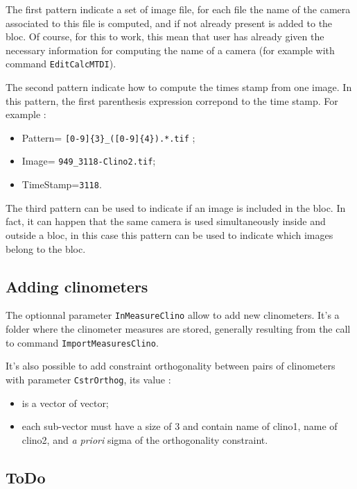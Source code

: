 The first pattern indicate a set of image file, for each file the
name of the camera associated to this file is computed, and if not already
present is added to the bloc. Of course, for this to work, this mean 
that user has already given the necessary information for computing the
name of a camera (for example with command {\tt EditCalcMTDI}).

The second pattern indicate how to compute the times stamp from one image.
In this pattern, the first parenthesis expression correpond to the time stamp.
For example :

\begin{itemize}
	\item  Pattern= {\tt [0-9]\{3\}\_([0-9]\{4\}).*.tif} ;
	\item  Image= {\tt 949\_3118-Clino2.tif};
        \item  TimeStamp={\tt 3118}.
\end{itemize}


The third pattern can be used to indicate if an image is included in the bloc.
In fact, it can happen that the same camera  is  used simultaneously
inside and outside a bloc, in this case this pattern can be used to indicate
which images belong to the bloc.

\subsection{Adding clinometers}

The optionnal parameter {\tt InMeasureClino} allow to add 
new clinometers. It's a folder where  the clinometer
measures are stored, generally resulting from the call to command {\tt ImportMeasuresClino}.

It's also possible to add constraint orthogonality between  pairs of clinometers
with parameter {\tt CstrOrthog}, its value :

\begin{itemize}
	\item  is a vector of vector;
	\item  each sub-vector must have a size of $3$ and contain name of clino1, name of clino2,
              and \emph{a priori} sigma of the orthogonality constraint.
\end{itemize}

\subsection{ToDo}

